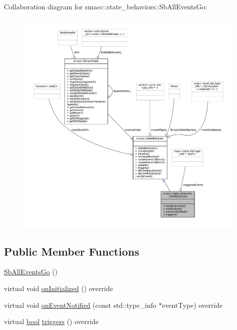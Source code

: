 Collaboration diagram for smacc\+:\+:state\+\_\+behaviors\+:\+:Sb\+All\+Events\+Go\+:
\nopagebreak
\begin{figure}[H]
\begin{center}
\leavevmode
\includegraphics[width=350pt]{classsmacc_1_1state__behaviors_1_1SbAllEventsGo__coll__graph}
\end{center}
\end{figure}
\subsection*{Public Member Functions}
\begin{DoxyCompactItemize}
\item 
\hyperlink{classsmacc_1_1state__behaviors_1_1SbAllEventsGo_a6970cf63ab277b8325237220ddc0da42}{Sb\+All\+Events\+Go} ()
\item 
virtual void \hyperlink{classsmacc_1_1state__behaviors_1_1SbAllEventsGo_ade329752139890dd85144754684f90c7}{on\+Initialized} () override
\item 
virtual void \hyperlink{classsmacc_1_1state__behaviors_1_1SbAllEventsGo_af2d7f203958b5903f66f60d10fd16065}{on\+Event\+Notified} (const std\+::type\+\_\+info $\ast$event\+Type) override
\item 
virtual \hyperlink{classbool}{bool} \hyperlink{classsmacc_1_1state__behaviors_1_1SbAllEventsGo_ab621a3c319c13968c99ac7a997f7ebc9}{triggers} () override
\end{DoxyCompactItemize}
